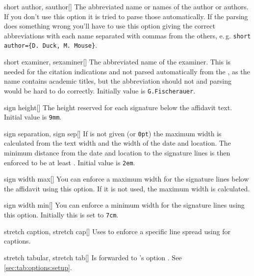\begin{describeopt}{short author, sauthor}[]
  The abbreviated name or names of the author or authors. If you don't use this
  option it is tried to parse those automatically. If the parsing does something
  wrong you'll have to use this option giving the correct abbreviations with
  each name separated with commas from the others, e.\,g.\@ 
  \texttt{short author=\{D. Duck, M. Mouse\}}.
\end{describeopt}
\begin{describeopt}{short examiner, sexaminer}[]
  The abbreviated name of the examiner. This is needed for the citation
  indications and not parsed automatically from the , as the name
  contains academic titles, but the abbreviation should not and parsing would be
  hard to do correctly. Initially value is \texttt{G.\@ Fischerauer}.
\end{describeopt}
\begin{describeopt}{sign height}[]
  The height reserved for each signature below the affidavit text. Initial value
  is \texttt{9mm}.
\end{describeopt}
\begin{describeopt}{sign separation, sign sep}[]
  If  is not given (or \texttt{0pt}) the maximum width is
  calculated from the text width and the width of the date and location. The
  minimum distance from the date and location to the signature lines is then
  enforced to be at least . Initial value is \texttt{2em}.
\end{describeopt}
\begin{describeopt}{sign width max}[]
  You can enforce a maximum width for the signature lines below the affidavit
  using this option. If it is not used, the maximum width is calculated.
\end{describeopt}
\begin{describeopt}{sign width min}[]
  You can enforce a minimum width for the signature lines using this option.
  Initially this is set to \texttt{7cm}.
\end{describeopt}
\begin{describeopt}{stretch caption, stretch cap}[]
  Uses  to enforce a specific line spread using 
  for captions.
\end{describeopt}
\begin{describeopt}{stretch tabular, stretch tab}[]
  Is forwarded to 's option . See
  \autoref{sec:tab:options:setup}.
\end{describeopt}
